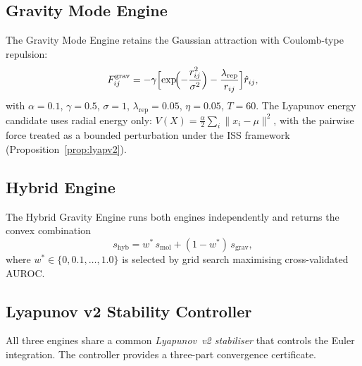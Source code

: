 \documentclass[final]{siamltex}
\newcommand{\norm}[1]{\lVert #1 \rVert}
\begin{document}
\subsection{Gravity Mode Engine}\label{sec:gravity_mode}

The Gravity Mode Engine retains the Gaussian attraction
with Coulomb-type repulsion:
\begin{equation}\label{eq:gravforce}
  F_{ij}^{\mathrm{grav}} = -\gamma\Bigl[
  \exp\!\Bigl(-\frac{r_{ij}^2}{\sigma^2}\Bigr)
  - \frac{\lambda_{\mathrm{rep}}}{r_{ij}}\Bigr]\hat{r}_{ij},
\end{equation}
with $\alpha=0.1$, $\gamma=0.5$, $\sigma=1$,
$\lambda_{\mathrm{rep}}=0.05$, $\eta=0.05$, $T=60$.
The Lyapunov energy candidate uses radial energy only:
$V(X) = \tfrac{\alpha}{2}\sum_i\norm{x_i - \mu}^2$,
with the pairwise force treated as a bounded perturbation under
the ISS framework (Proposition~\ref{prop:lyapv2}).

\subsection{Hybrid Engine}\label{sec:hybrid}

The Hybrid Gravity Engine runs both engines independently and
returns the convex combination
\begin{equation}\label{eq:hybrid}
  s_{\mathrm{hyb}} = w^*\,s_{\mathrm{mol}}
  + (1 - w^*)\,s_{\mathrm{grav}},
\end{equation}
where $w^*\in\{0,0.1,\ldots,1.0\}$ is selected by grid search
maximising cross-validated AUROC.

\subsection{Lyapunov v2 Stability Controller}\label{sec:lyapv2}

All three engines share a common \emph{Lyapunov~v2 stabiliser}
that controls the Euler integration.  The controller provides a
three-part convergence certificate.
\end{document}
